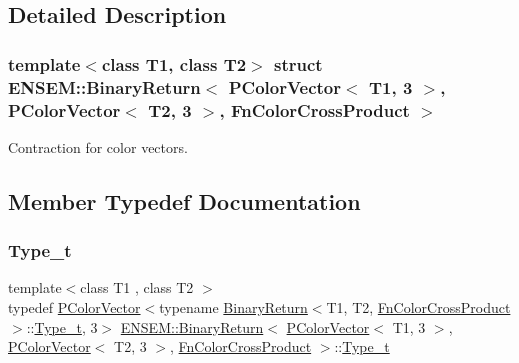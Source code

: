 \subsection{Detailed Description}
\subsubsection*{template$<$class T1, class T2$>$\newline
struct E\+N\+S\+E\+M\+::\+Binary\+Return$<$ P\+Color\+Vector$<$ T1, 3 $>$, P\+Color\+Vector$<$ T2, 3 $>$, Fn\+Color\+Cross\+Product $>$}

Contraction for color vectors. 

\subsection{Member Typedef Documentation}
\mbox{\label{structENSEM_1_1BinaryReturn_3_01PColorVector_3_01T1_00_013_01_4_00_01PColorVector_3_01T2_00_013_ba40478e41b9dc719d7fd5b6b54bac05_a1ee2bf6b3057b787867e31a8bafe80a6}} 
\subsubsection{\texorpdfstring{Type\_t}{Type\_t}\hspace{0.1cm}{\footnotesize\ttfamily [1/2]}}
{\footnotesize\ttfamily template$<$class T1 , class T2 $>$ \\
typedef \mbox{\hyperlink{classENSEM_1_1PColorVector}{P\+Color\+Vector}}$<$typename \mbox{\hyperlink{structENSEM_1_1BinaryReturn}{Binary\+Return}}$<$T1, T2, \mbox{\hyperlink{structENSEM_1_1FnColorCrossProduct}{Fn\+Color\+Cross\+Product}}$>$\+::\mbox{\hyperlink{structENSEM_1_1BinaryReturn_3_01PColorVector_3_01T1_00_013_01_4_00_01PColorVector_3_01T2_00_013_ba40478e41b9dc719d7fd5b6b54bac05_a1ee2bf6b3057b787867e31a8bafe80a6}{Type\+\_\+t}}, 3$>$ \mbox{\hyperlink{structENSEM_1_1BinaryReturn}{E\+N\+S\+E\+M\+::\+Binary\+Return}}$<$ \mbox{\hyperlink{classENSEM_1_1PColorVector}{P\+Color\+Vector}}$<$ T1, 3 $>$, \mbox{\hyperlink{classENSEM_1_1PColorVector}{P\+Color\+Vector}}$<$ T2, 3 $>$, \mbox{\hyperlink{structENSEM_1_1FnColorCrossProduct}{Fn\+Color\+Cross\+Product}} $>$\+::\mbox{\hyperlink{structENSEM_1_1BinaryReturn_3_01PColorVector_3_01T1_00_013_01_4_00_01PColorVector_3_01T2_00_013_ba40478e41b9dc719d7fd5b6b54bac05_a1ee2bf6b3057b787867e31a8bafe80a6}{Type\+\_\+t}}}

